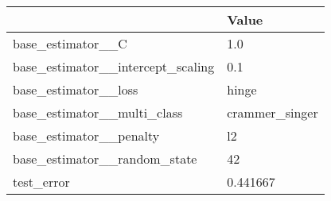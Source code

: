\begin{tabular}{ll}
\toprule
{} &           Value \\
\midrule
base\_estimator\_\_C                 &             1.0 \\
base\_estimator\_\_intercept\_scaling &             0.1 \\
base\_estimator\_\_loss              &           hinge \\
base\_estimator\_\_multi\_class       &  crammer\_singer \\
base\_estimator\_\_penalty           &              l2 \\
base\_estimator\_\_random\_state      &              42 \\
test\_error                        &        0.441667 \\
\bottomrule
\end{tabular}
